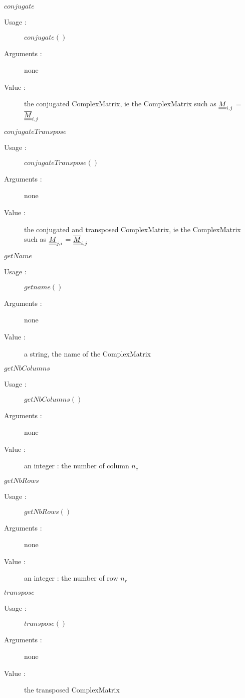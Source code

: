 \begin{description}
\begin{description}
  \item $conjugate$
    \begin{description}
    \item[Usage :] $conjugate()$
    \item[Arguments :] none
    \item[Value :] the conjugated ComplexMatrix, ie the ComplexMatrix such as ${\underline{\underline{M}}}_{i,j}$ = ${\underline{\underline{\overline{M}}}}_{i,j}$
    \end{description}
    \bigskip

  \item $conjugateTranspose$
    \begin{description}
    \item[Usage :] $conjugateTranspose()$
    \item[Arguments :] none
    \item[Value :] the conjugated and transposed ComplexMatrix, ie the ComplexMatrix such as ${\underline{\underline{M}}}_{j,i}$ = ${\underline{\underline{\overline{M}}}}_{i,j}$
    \end{description}
    \bigskip

  \item $getName$
    \begin{description}
    \item[Usage :] $getname()$
    \item[Arguments :] none
    \item[Value :] a string, the name of the ComplexMatrix
    \end{description}
    \bigskip

  \item $getNbColumns$
    \begin{description}
    \item[Usage :] $getNbColumns()$
    \item[Arguments :] none
    \item[Value :] an integer : the number of column $n_c$
    \end{description}
    \bigskip

  \item $getNbRows$
    \begin{description}
    \item[Usage :] $getNbRows()$
    \item[Arguments :] none
    \item[Value :] an integer : the number of row $n_r$
    \end{description}
    \bigskip

  \item $transpose$
    \begin{description}
    \item[Usage :] $transpose()$
    \item[Arguments :] none
    \item[Value :] the transposed ComplexMatrix
    \end{description}
    \bigskip


\end{description}
\end{description}
